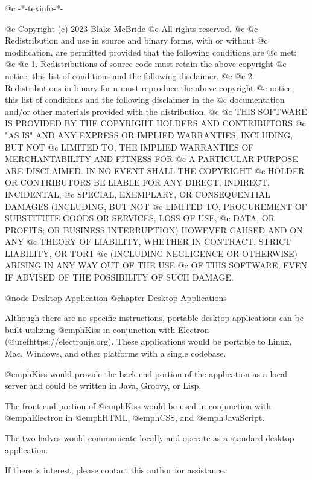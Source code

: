 @c -*-texinfo-*-

@c  Copyright (c) 2023 Blake McBride
@c  All rights reserved.
@c
@c  Redistribution and use in source and binary forms, with or without
@c  modification, are permitted provided that the following conditions are
@c  met:
@c
@c  1. Redistributions of source code must retain the above copyright
@c  notice, this list of conditions and the following disclaimer.
@c
@c  2. Redistributions in binary form must reproduce the above copyright
@c  notice, this list of conditions and the following disclaimer in the
@c  documentation and/or other materials provided with the distribution.
@c
@c  THIS SOFTWARE IS PROVIDED BY THE COPYRIGHT HOLDERS AND CONTRIBUTORS
@c  "AS IS" AND ANY EXPRESS OR IMPLIED WARRANTIES, INCLUDING, BUT NOT
@c  LIMITED TO, THE IMPLIED WARRANTIES OF MERCHANTABILITY AND FITNESS FOR
@c  A PARTICULAR PURPOSE ARE DISCLAIMED. IN NO EVENT SHALL THE COPYRIGHT
@c  HOLDER OR CONTRIBUTORS BE LIABLE FOR ANY DIRECT, INDIRECT, INCIDENTAL,
@c  SPECIAL, EXEMPLARY, OR CONSEQUENTIAL DAMAGES (INCLUDING, BUT NOT
@c  LIMITED TO, PROCUREMENT OF SUBSTITUTE GOODS OR SERVICES; LOSS OF USE,
@c  DATA, OR PROFITS; OR BUSINESS INTERRUPTION) HOWEVER CAUSED AND ON ANY
@c  THEORY OF LIABILITY, WHETHER IN CONTRACT, STRICT LIABILITY, OR TORT
@c  (INCLUDING NEGLIGENCE OR OTHERWISE) ARISING IN ANY WAY OUT OF THE USE
@c  OF THIS SOFTWARE, EVEN IF ADVISED OF THE POSSIBILITY OF SUCH DAMAGE.


@node Desktop Application
@chapter Desktop Applications

Although there are no specific instructions, portable desktop
applications can be built utilizing @emph{Kiss} in conjunction with
Electron (@uref{https://electronjs.org}).  These
applications would be portable to Linux, Mac, Windows, and other
platforms with a single codebase.

@emph{Kiss} would provide the back-end portion of the application as a
local server and could be written in Java, Groovy, or Lisp.  

The front-end portion of @emph{Kiss} would be used in conjunction with
@emph{Electron} in @emph{HTML}, @emph{CSS}, and @emph{JavaScript}.

The two halves would communicate locally and operate as a standard
desktop application.

If there is interest, please contact this author for assistance.
